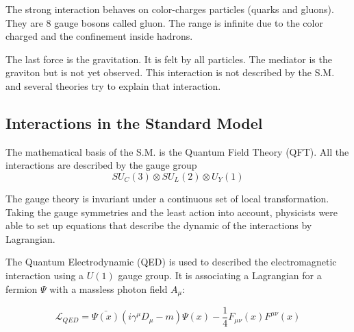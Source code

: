     The strong interaction behaves on color-charges particles (quarks and gluons).
    They are 8 gauge bosons called gluon.
    The range is infinite due to the color charged and the confinement inside hadrons.

    The last force is the gravitation. 
    It is felt by all particles.
    The mediator is the graviton but is not yet observed.
    This interaction is not described by the S.M. and several theories try to explain that interaction.


    \subsection{Interactions in the Standard Model}

	The mathematical basis of the S.M. is the Quantum Field Theory (QFT). All the interactions are described by the gauge group 
    \begin{equation}
    	SU_C(3) \otimes SU_L(2) \otimes U_Y(1)
	\end{equation}
    
    The gauge theory is invariant under a continuous set of local transformation.
    Taking the gauge symmetries and the least action into account, physicists were able to set up equations that describe the dynamic of the interactions by Lagrangian.
    
	The Quantum Electrodynamic (QED) is used to described the electromagnetic interaction using a $U(1)$ gauge group. It is associating a Lagrangian for a fermion $\Psi$ with a massless photon field $A_\mu$:
    
    \begin{equation}
    	\mathcal{L}_{QED} =  \bar{\Psi\left(x\right)}\left( i \gamma^\mu D_\mu - m \right) \Psi\left(x\right) - \frac{1}{4}F_{\mu \nu}\left(x\right) F^{\mu \nu}\left(x\right)
    \end{equation}

